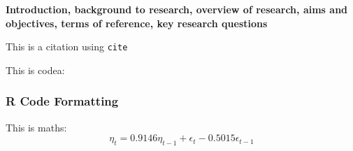 \textbf{Introduction, background to research, overview of research, aims and objectives, terms of reference, key research questions}

This is a citation \cite{Tibshirani_1996} using \texttt{cite}

This is codea:
\subsubsection{R Code Formatting}


This is maths:
\begin{equation}
\eta_t = 0.9146\eta_{t-1} + \epsilon_t -0.5015\epsilon_{t-1}
\end{equation}

